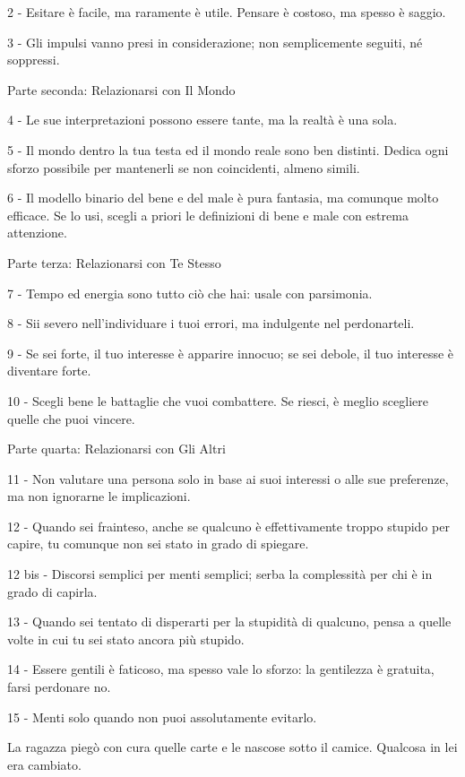 2 - Esitare è facile, ma raramente è utile. Pensare è costoso, ma spesso è saggio.

3 - Gli impulsi vanno presi in considerazione; non semplicemente seguiti, né soppressi.

Parte seconda: Relazionarsi con Il Mondo

4 - Le sue interpretazioni possono essere tante, ma la realtà è una sola.

5 - Il mondo dentro la tua testa ed il mondo reale sono ben distinti. Dedica ogni sforzo possibile per mantenerli se non coincidenti, almeno simili.

6 - Il modello binario del bene e del male è pura fantasia, ma comunque molto efficace. Se lo usi, scegli a priori le definizioni di bene e male con estrema attenzione.

Parte terza: Relazionarsi con Te Stesso

7 - Tempo ed energia sono tutto ciò che hai: usale con parsimonia.

8 - Sii severo nell’individuare i tuoi errori, ma indulgente nel perdonarteli.

9 - Se sei forte, il tuo interesse è apparire innocuo; se sei debole, il tuo interesse è diventare forte.

10 - Scegli bene le battaglie che vuoi combattere. Se riesci, è meglio scegliere quelle che puoi vincere.

Parte quarta: Relazionarsi con Gli Altri

11 - Non valutare una persona solo in base ai suoi interessi o alle sue preferenze, ma non ignorarne le implicazioni.

12 - Quando sei frainteso, anche se qualcuno è effettivamente troppo stupido per capire, tu comunque non sei stato in grado di spiegare.

12 bis - Discorsi semplici per menti semplici; serba la complessità per chi è in grado di capirla.

13 - Quando sei tentato di disperarti per la stupidità di qualcuno, pensa a quelle volte in cui tu sei stato ancora più stupido.

14 - Essere gentili è faticoso, ma spesso vale lo sforzo: la gentilezza è gratuita, farsi perdonare no.

15 - Menti solo quando non puoi assolutamente evitarlo.

La ragazza piegò con cura quelle carte e le nascose sotto il camice. Qualcosa in lei era cambiato.
